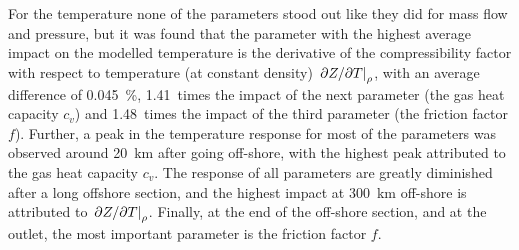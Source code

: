 For the temperature none of the parameters stood out like they did for mass flow and pressure, but it was found that the parameter with the highest average impact on the modelled temperature is the derivative of the compressibility factor with respect to temperature (at constant density) $\eval{\partial Z/\partial T}_\rho$, with an average difference of \SI{0.045}{\percent}, 1.41~times the impact of the next parameter (the gas heat capacity $c_v$) and 1.48~times the impact of the third parameter (the friction factor $f$). Further, a peak in the temperature response for most of the parameters was observed around \SI{20}{\kilo\meter} after going off-shore, with the highest peak attributed to the gas heat capacity $c_v$. %
The response of all parameters are greatly diminished after a long offshore section, and the highest impact at \SI{300}{\kilo\meter} off-shore is attributed to $\eval{\partial Z/\partial T}_\rho$. Finally, at the end of the off-shore section, and at the outlet, the most important parameter is the friction factor $f$.

